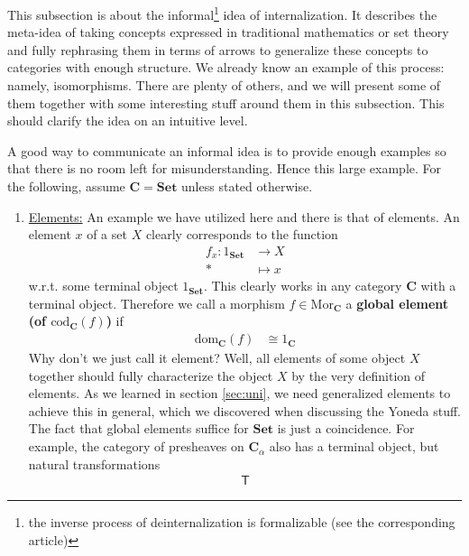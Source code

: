 \nocite{eec64bc7}
This subsection is about the informal\footnote{the inverse process of deinternalization is formalizable (see the corresponding \cite{wiki-nlab0000} article)} idea of internalization.
It describes the meta-idea of taking concepts expressed in traditional mathematics or set theory and fully rephrasing them in terms of arrows to generalize these concepts to categories with enough structure.
We already know an example of this process: namely, isomorphisms.
There are plenty of others, and we will present some of them together with some interesting stuff around them in this subsection.
This should clarify the idea on an intuitive level.
\\
\begin{exa}
\label{exa:ofinternaliz}
A good way to communicate an informal idea is to provide enough examples so that there is no room left for misunderstanding.
Hence this large example.
For the following, assume $\mathbf{C} = \mathbf{Set}$ unless stated otherwise.
\begin{enumerate}
\item[$\bullet$]
\underline{Elements:}
An example we have utilized here and there is that of elements.
An element $x$ of a set $X$ clearly corresponds to the function
\begin{align*}
  f_{x}
  \colon
  1_{\mathbf{Set}}
  &\rightarrow
  X
  \\
  \ast
  &\mapsto
  x
\end{align*}
w.r.t. some terminal object $1_{\mathbf{Set}}$.
This clearly works in any category $\mathbf{C}$ with a terminal object.
Therefore we call a morphism $f \in \mathrm{Mor}_{\mathbf{C}}$ a \textbf{global element (of $\mathrm{cod}_{\mathbf{C}}(f)$)} if
\begin{align*}
  \mathrm{dom}_{\mathbf{C}}(f)
  &\cong
  1_{\mathbf{C}}
\end{align*}
Why don't we just call it {\glqq}element{\grqq}?
Well, all elements of some object $X$ together should fully characterize the object $X$ by the very definition of elements.
As we learned in section \ref{sec:uni}, we need generalized elements to achieve this in general, which we discovered when discussing the Yoneda stuff.
The fact that global elements suffice for $\mathbf{Set}$ is just a coincidence.
For example, the category of presheaves on $\mathbf{C}_{\alpha}$ also has a terminal object, but natural transformations
\begin{align*}
  \mathsf{T}

\end{align*}
\end{enumerate}
\end{exa}
